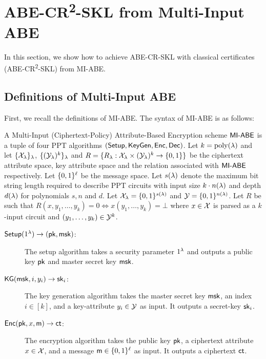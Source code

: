 
\section{ABE-CR\textsuperscript{2}-SKL from Multi-Input ABE}\label{sec:ABR-CR2-SKL}
In this section, we show how to achieve ABE-CR-SKL with classical certificates (ABE-CR\textsuperscript{2}-SKL) from MI-ABE.
\subsection{Definitions of Multi-Input ABE}\label{sec:def-mi-abe}
First, we recall the definitions of MI-ABE.
The syntax of MI-ABE is as follows:

\begin{definition}\label{def:miabe}
A Multi-Input (Ciphertext-Policy) Attribute-Based Encryption scheme
$\mathsf{MI}\textrm{-}\mathsf{ABE}$ is a tuple of four PPT algorithms $(\mathsf{Setup}, \mathsf{KeyGen},
\allowbreak \mathsf{Enc},
\mathsf{Dec})$. Let $k={\mathrm{poly}}(\lambda)$ and let $\{\mathcal{X}_\lambda\}_\lambda$,
$\{(\mathcal{Y}_\lambda)^k\}_\lambda$ and $R = \{R_\lambda: \mathcal{X}_\lambda \times
(\mathcal{Y}_\lambda)^k \rightarrow \{0,1\}\}$ be the ciphertext attribute space, key
attribute space and the relation associated with $\mathsf{MI}\textrm{-}\mathsf{ABE}$
respectively. Let $\{0,1\}^\ell$ be the message space. Let $s(\lambda)$
denote the maximum bit string length required to describe PPT
circuits with input size $k\cdot n(\lambda)$ and depth $d(\lambda)$ for
polynomials $s, n$ and $d$. Let $\mathcal{X}_\lambda = \{0,1\}^{s(\lambda)}$ and
$\mathcal{Y} = \{0,1\}^{n(\lambda)}$. Let $R$ be such that $R(x, y_1, \ldots,
y_k) = 0 \iff x(y_1, \ldots, y_k) = \bot$ where $x \in \mathcal{X}$ is
parsed as a $k$-input circuit and $(y_1, \ldots, y_k)\in \mathcal{Y}^k$. 

\begin{description}
\item[$\mathsf{Setup}(1^\lambda)\rightarrow(\mathsf{pk},\mathsf{msk})$:] The setup algorithm takes a security parameter $1^\lambda$ and outputs a public key $\mathsf{pk}$ and master secret key $\mathsf{msk}$.

\item[$\mathsf{KG}(\mathsf{msk}, i, y_i)\rightarrow \mathsf{sk}_i$:] The key generation algorithm
takes the master secret key $\mathsf{msk}$, an index $i \in [k]$, and a
key-attribute $y_i \in \mathcal{Y}$ as input. It outputs a secret-key
$\mathsf{sk}_i$.

\item[$\mathsf{Enc}(\mathsf{pk}, x, \mathsf{m})\rightarrow \mathsf{ct}$:] The encryption algorithm takes
the public key $\mathsf{pk}$, a ciphertext attribute $x \in \mathcal{X}$, and a
message $\mathsf{m} \in \{0,1\}^\ell$ as input. It outputs a ciphertext
$\mathsf{ct}$.


\end{description}
\end{definition}

